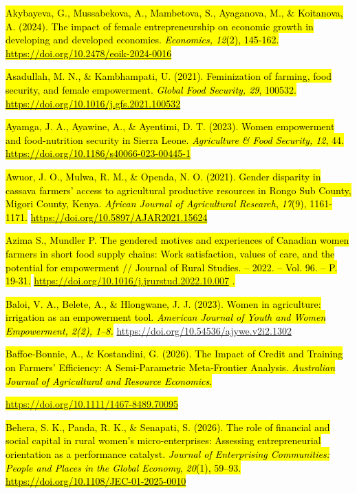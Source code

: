 \documentclass[
]{article}
\begin{document}
\hl{Akybayeva, G., Mussabekova, A., Mambetova, S., Ayaganova, M., \&
Koitanova, A. (2024). The impact of female entrepreneurship on economic
growth in developing and developed economies. \emph{Economics, 12}(2),
145-162.}
\href{https://doi.org/10.2478/eoik-2024-0016}{\hl{https://doi.org/10.2478/eoik-2024-0016}}

\hl{Asadullah, M. N., \& Kambhampati, U. (2021). Feminization of
farming, food security, and female empowerment. \emph{Global Food
Security, 29}, 100532.}
\href{https://doi.org/10.1016/j.gfs.2021.100532}{\hl{https://doi.org/10.1016/j.gfs.2021.100532}}

\hl{Ayamga, J. A., Ayawine, A., \& Ayentimi, D. T. (2023). Women
empowerment and food-nutrition security in Sierra Leone.
\emph{Agriculture \& Food Security, 12}, 44.}
\href{https://doi.org/10.1186/s40066-023-00445-1}{\hl{https://doi.org/10.1186/s40066-023-00445-1}}

\hl{Awuor, J. O., Mulwa, R. M., \& Openda, N. O. (2021). Gender
disparity in cassava farmers' access to agricultural productive
resources in Rongo Sub County, Migori County, Kenya. \emph{African
Journal of Agricultural Research}, \emph{17}(9), 1161-1171.}
\href{https://doi.org/10.5897/AJAR2021.15624}{\hl{https://doi.org/10.5897/AJAR2021.15624}}

\hl{Azima S., Mundler P. The gendered motives and experiences of
Canadian women farmers in short food supply chains: Work satisfaction,
values of care, and the potential for empowerment // Journal of Rural
Studies. -- 2022. -- Vol. 96. -- P. 19-31.}
\hl{\mbox{\url{https://doi.org/10.1016/j.jrurstud.2022.10.007}} .}

\hl{Baloi, V. A., Belete, A., \& Hlongwane, J. J. (2023). Women in
agriculture: irrigation as an empowerment tool. \emph{American Journal
of Youth and Women Empowerment, 2(2), 1--8.}}
\href{https://doi.org/10.54536/ajywe.v2i2.1302}{\hl{}https://doi.org/10.54536/ajywe.v2i2.1302}

\hl{Baffoe‐Bonnie, A., \& Kostandini, G. (2026). The Impact of Credit
and Training on Farmers' Efficiency: A Semi‐Parametric Meta‐Frontier
Analysis. \emph{Australian Journal of Agricultural and Resource
Economics}.}

\hl{\mbox{\url{https://doi.org/10.1111/1467-8489.70095}}}

\hl{Behera, S. K., Panda, R. K., \& Senapati, S. (2026). The role of
financial and social capital in rural women's micro-enterprises:
Assessing entrepreneurial orientation as a performance catalyst.
\emph{Journal of Enterprising Communities: People and Places in the
Global Economy}, \emph{20}(1), 59--93.}
\href{https://doi.org/10.1108/JEC-01-2025-0010}{\hl{https://doi.org/10.1108/JEC-01-2025-0010}}
\end{document}

